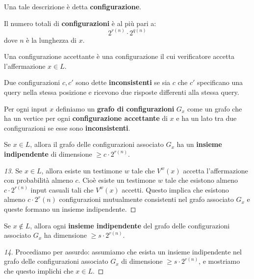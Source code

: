 \documentclass[\main/main.tex]{subfiles}
\begin{document}
\begin{multicols}{2}
\begin{definition}[Configurazione]
    Una tale descrizione è detta \textbf{configurazione}.
\end{definition}
\begin{observation}
    Il numero totali di \textbf{configurazioni} è al più pari a:
    \[
        2^{r(n)} \cdot 2^{q(n)}
    \]
    dove \(n\) è la lunghezza di \(x\).
\end{observation}
\begin{property}
    Una configurazione accettante è una configurazione il cui verificatore accetta l'affermazione \(x \in L\).
\end{property}
\begin{property}
    Due configurazioni \(c, c'\) sono dette \textbf{inconsistenti} se sia \(c\) che \(c'\) specificano una query nella stessa posizione e ricevono due risposte differenti alla stessa query.
\end{property}
\begin{definition}
    Per ogni input \(x\) definiamo un \textbf{grafo di configurazioni} \(G_x\) come un grafo che ha un vertice per ogni \textbf{configurazione accettante} di \(x\) e ha un lato tra due configurazioni se esse sono \textbf{inconsistenti}.
\end{definition}
\begin{claim}[13]
    Se \(x \in L\), allora il grafo delle configurazioni associato \(G_x\) ha un \textbf{insieme indipendente} di dimensione \(\geq c \cdot 2^{r(n)}\).
\end{claim}
\begin{proof}[13]
    Se \(x \in L\), allora esiste un testimone \(w\) tale che \(V^{w}(x)\) accetta l'affermazione con probabilità almeno \(c\). Cioè esiste un testimone \(w\) tale che esistono almeno \(c \cdot 2^{r(n)}\) input casuali tali che \(V^{w}(x)\) accetti. Questo implica che esistono almeno \(c \cdot 2^{r}(n)\) configurazioni mutualmente consistenti nel grafo associato \(G_x\) e queste formano un insieme indipendente.
\end{proof}
\begin{claim}[14]
    Se \(x \not\in L\), allora ogni \textbf{insieme indipendente} del grafo delle configurazioni associato \(G_x\) ha dimensione \(\geq s \cdot 2^{r(n)}\).
\end{claim}
\begin{proof}[14]
    Procediamo per assurdo: assumiamo che esista un insieme indipendente nel grafo delle configurazioni associato \(G_x\) di dimensione \(\geq s \cdot 2^{r(n)}\), e mostriamo che questo implichi che \(x \in L\).
    

\end{proof}
\end{multicols}
\end{document}
